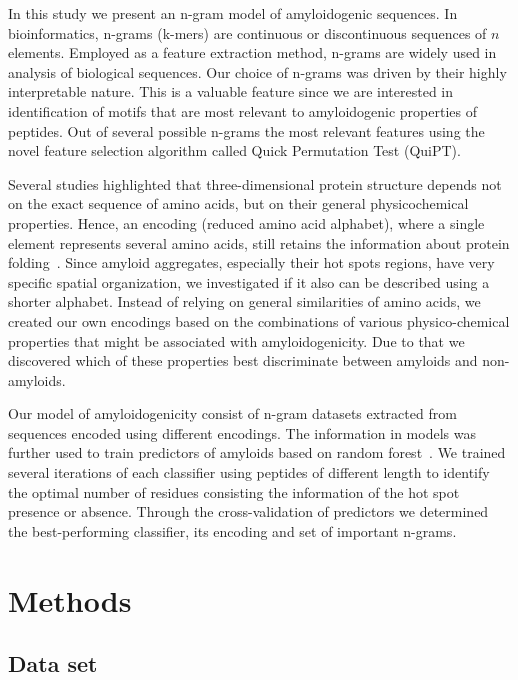 \documentclass[a4,center,fleqn]{NAR}
\begin{document}
\enlargethispage{-65.1pt}

  In this study we present an n-gram model of amyloidogenic sequences. In 
bioinformatics, n-grams (k-mers) are continuous or discontinuous sequences of 
$n$ elements. Employed as a feature extraction method, n-grams are widely used 
in analysis of biological sequences. Our choice of n-grams was driven by their 
highly interpretable nature. This is a valuable feature since we are interested 
in identification of motifs that are most relevant to amyloidogenic properties 
of peptides. Out of several possible n-grams the most relevant features using 
the novel feature selection algorithm called Quick Permutation Test (QuiPT).

  Several studies highlighted that three-dimensional protein structure depends 
not on the exact sequence of amino acids, but on their general physicochemical 
properties. Hence, an encoding (reduced amino acid alphabet), where a single 
element 
represents several amino acids, still retains the information about protein 
folding~\citep{murphy_simplified_2000}. Since amyloid aggregates, especially 
their hot spots regions, have very specific spatial organization, we 
investigated if it also can be described using a shorter alphabet. Instead of 
relying on general similarities of amino acids, we created our own encodings 
based on the combinations of various physico-chemical properties that might be 
associated with amyloidogenicity. Due to that we discovered which of these
properties best discriminate between amyloids and non-amyloids.

  Our model of amyloidogenicity consist of n-gram datasets extracted from 
sequences encoded using different encodings. The information 
in models was further used to train predictors of amyloids based on random 
forest~\citep{breiman_random_2001}. We trained several iterations of each 
classifier using peptides of different length to identify the optimal number of 
residues consisting the information of the hot spot presence or absence. 
Through the cross-validation of predictors we determined the best-performing 
classifier, its encoding and set of important n-grams.


\section{Methods}
\subsection{Data set}
\end{document}
